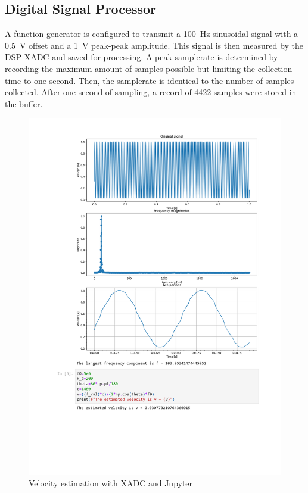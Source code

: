 \subsection{Digital Signal Processor}
A function generator is configured to transmit a \qty{100}{\hertz} sinusoidal signal with a \qty{0.5}{\volt} offset and a \qty{1}{\volt} peak-peak amplitude. This signal is then measured by the DSP XADC and saved for processing. A peak samplerate is determined by recording the maximum amount of samples possible but limiting the collection time to one second. Then, the samplerate is identical to the number of samples collected. After one second of sampling, a record of 4422 samples were stored in the buffer.
\begin{figure}[htbp]
	\centering
	\includegraphics[width=\textwidth]{Figures/5_velocity_estimation_measured.pdf}
	\caption{Velocity estimation with XADC and Jupyter}
	\label{fig:5_velocity_estimation_output}
\end{figure}
